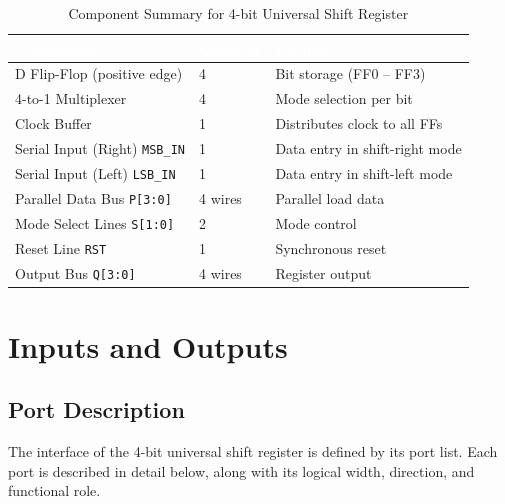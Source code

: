 \documentclass[12pt,a4paper]{report}
\newcommand{\signal}[1]{\texttt{\textcolor{codeblue}{#1}}}
\begin{document}
\begin{table}[H]
    \centering
    \caption{Component Summary for 4-bit Universal Shift Register}
    \begin{tabular}{lll}
        \toprule
        \rowcolor{tableheader}
        \textcolor{white}{\textbf{Component}} &
        \textcolor{white}{\textbf{Quantity}} &
        \textcolor{white}{\textbf{Purpose}} \\
        \midrule
        D Flip-Flop (positive edge) & 4 & Bit storage (FF0 – FF3) \\
        4-to-1 Multiplexer & 4 & Mode selection per bit \\
        Clock Buffer & 1 & Distributes clock to all FFs \\
        Serial Input (Right) \signal{MSB\_IN} & 1 & Data entry in shift-right mode \\
        Serial Input (Left) \signal{LSB\_IN} & 1 & Data entry in shift-left mode \\
        Parallel Data Bus \signal{P[3:0]} & 4 wires & Parallel load data \\
        Mode Select Lines \signal{S[1:0]} & 2 & Mode control \\
        Reset Line \signal{RST} & 1 & Synchronous reset \\
        Output Bus \signal{Q[3:0]} & 4 wires & Register output \\
        \bottomrule
    \end{tabular}
    \label{tab:components}
\end{table}

\chapter{Inputs and Outputs}

\section{Port Description}

The interface of the 4-bit universal shift register is defined by its port list. Each port is described in detail below, along with its logical width, direction, and functional role.
\end{document}

